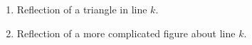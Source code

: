 \documentclass{tufte-handout}
\begin{document}
\begin{tcolorbox}
\begin{enumerate}
      \item Reflection of a triangle in line $k.$
      \begin{center}
      \end{center}
      \item Reflection of a more complicated figure about line $k.$
      \begin{center}

\end{center}
\end{enumerate}
\end{tcolorbox}
\end{document}
